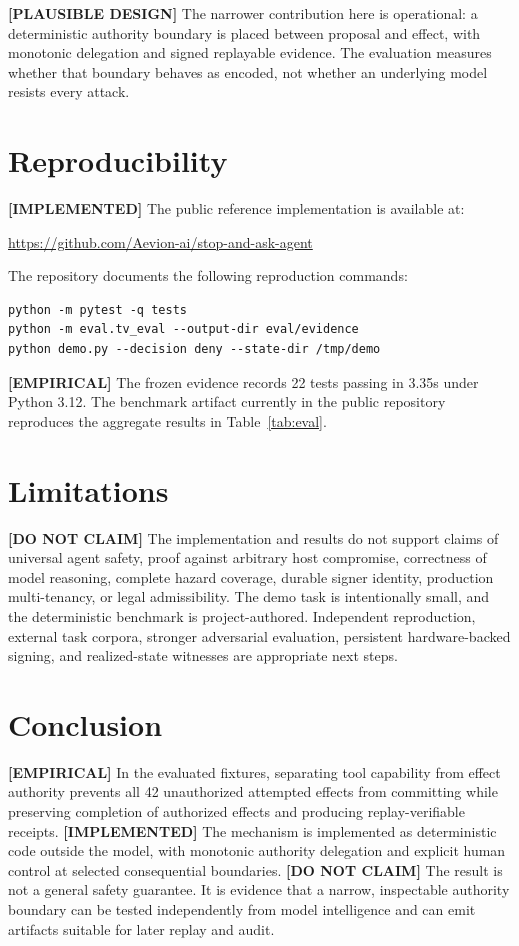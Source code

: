 \documentclass[10pt,twocolumn]{article}
\newcommand{\implemented}{\textbf{[IMPLEMENTED] }}
\newcommand{\empirical}{\textbf{[EMPIRICAL] }}
\newcommand{\plausibledesign}{\textbf{[PLAUSIBLE DESIGN] }}
\newcommand{\donotclaim}{\textbf{[DO NOT CLAIM] }}
\begin{document}
\plausibledesign The narrower contribution here is operational: a deterministic authority boundary is placed between proposal and effect, with monotonic delegation and signed replayable evidence. The evaluation measures whether that boundary behaves as encoded, not whether an underlying model resists every attack.

\section{Reproducibility}
\implemented The public reference implementation is available at:
\begin{center}
\url{https://github.com/Aevion-ai/stop-and-ask-agent}
\end{center}
The repository documents the following reproduction commands:
\begin{verbatim}
python -m pytest -q tests
python -m eval.tv_eval --output-dir eval/evidence
python demo.py --decision deny --state-dir /tmp/demo
\end{verbatim}
\empirical The frozen evidence records 22 tests passing in 3.35s under Python 3.12. The benchmark artifact currently in the public repository reproduces the aggregate results in Table~\ref{tab:eval}.

\section{Limitations}
\donotclaim The implementation and results do not support claims of universal agent safety, proof against arbitrary host compromise, correctness of model reasoning, complete hazard coverage, durable signer identity, production multi-tenancy, or legal admissibility. The demo task is intentionally small, and the deterministic benchmark is project-authored. Independent reproduction, external task corpora, stronger adversarial evaluation, persistent hardware-backed signing, and realized-state witnesses are appropriate next steps.

\section{Conclusion}
\empirical In the evaluated fixtures, separating tool capability from effect authority prevents all 42 unauthorized attempted effects from committing while preserving completion of authorized effects and producing replay-verifiable receipts. \implemented The mechanism is implemented as deterministic code outside the model, with monotonic authority delegation and explicit human control at selected consequential boundaries. \donotclaim The result is not a general safety guarantee. It is evidence that a narrow, inspectable authority boundary can be tested independently from model intelligence and can emit artifacts suitable for later replay and audit.



\end{document}
